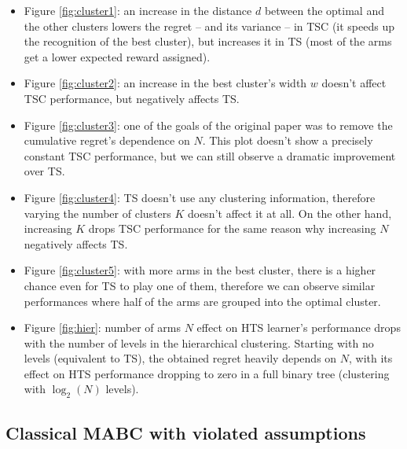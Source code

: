 \begin{itemize}
  \item Figure \ref{fig:cluster1}: an increase in the distance $d$ between the optimal and the other clusters lowers the regret -- and its variance -- in TSC (it speeds up the recognition of the best cluster), but increases it in TS (most of the arms get a lower expected reward assigned).
  \item Figure \ref{fig:cluster2}: an increase in the best cluster's width $w$ doesn't affect TSC performance, but negatively affects TS.
  \item Figure \ref{fig:cluster3}: one of the goals of the original paper was to remove the cumulative regret's dependence on $N$. This plot doesn't show a precisely constant TSC performance, but we can still observe a dramatic improvement over TS.
  \item Figure \ref{fig:cluster4}: TS doesn't use any clustering information, therefore varying the number of clusters $K$ doesn't affect it at all. On the other hand, increasing $K$ drops TSC performance for the same reason why increasing $N$ negatively affects TS.
  \item Figure \ref{fig:cluster5}: with more arms in the best cluster, there is a higher chance even for TS to play one of them, therefore we can observe similar performances where half of the arms are grouped into the optimal cluster.
  \item Figure \ref{fig:hier}: number of arms $N$ effect on HTS learner's performance drops with the number of levels in the hierarchical clustering. Starting with no levels (equivalent to TS), the obtained regret heavily depends on $N$, with its effect on HTS performance dropping to zero in a full binary tree (clustering with $\log_2(N)$ levels).
\end{itemize}

\subsection{Classical MABC with violated assumptions}


